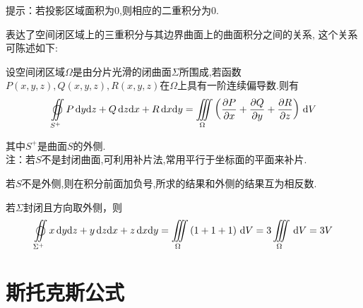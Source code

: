 \quad 提示：若投影区域面积为0,则相应的二重积分为0.

\theorem[高斯公式]
表达了空间闭区域上的三重积分与其边界曲面上的曲面积分之间的关系, 这个关系可陈述如下:
\par 设空间闭区域$\Omega $是由分片光滑的闭曲面$\Sigma $所围成,若函数$P(x, y, z),Q(x, y, z),R(x, y, z)$在$\Omega $上具有一阶连续偏导数.则有
\begin{equation}
	\oiint\limits_{S^+}P \,\d y\d z+Q\,\d z\d x+R\,\d x\d y=\iiint\limits_{\Omega}\left( \frac{\partial P}{\partial x}+\frac{\partial Q}{\partial y}+\frac{\partial R}{\partial z}\right)\,\d V 
\end{equation}
\par 其中$S^+$是曲面$S$的外侧.\\
注：若$S$不是封闭曲面,可利用补片法,常用平行于坐标面的平面来补片.
\par 若$S$不是外侧,则在积分前面加负号,所求的结果和外侧的结果互为相反数.

\example[曲面积分求体积]
若$\Sigma$封闭且方向取外侧，则
\begin{equation}
	\begin{split}
		\oiint\limits_{\Sigma^+}x \,\d y\d z+y\,\d z\d x+z\,\d x\d y=\iiint\limits_{\Omega}\left(1+1+1\right)\,\d V =3\iiint\limits_{\Omega} \,\d V =3V
	\end{split}
\end{equation}

\section{斯托克斯公式}
\vspace*{-1em}

